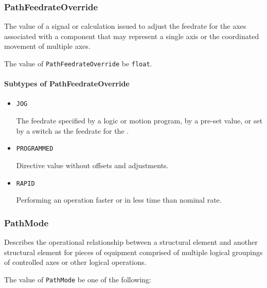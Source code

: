 \subsubsection{PathFeedrateOverride}
\label{sec:PathFeedrateOverride}



The value of a signal or calculation issued to adjust the feedrate for the axes associated with a  component that may represent a single axis or the coordinated movement of multiple axes.


The value of \texttt{PathFeedrateOverride} \MUST be \texttt{float}.


\paragraph{Subtypes of PathFeedrateOverride}\mbox{}
\label{sec:Subtypes of PathFeedrateOverride}

\begin{itemize}

\item \texttt{JOG}


The feedrate specified by a logic or motion program, by a pre-set value, or set by a switch as the feedrate for the . 

\item \texttt{PROGRAMMED}


Directive value without offsets and adjustments.

\item \texttt{RAPID}


Performing an operation faster or in less time than nominal rate.


\end{itemize}






\subsubsection{PathMode}
\label{sec:PathMode}



Describes the operational relationship between a  \gls{structural element} and another  \gls{structural element} for pieces of equipment comprised of multiple logical groupings of controlled axes or other logical operations.


The value of \texttt{PathMode} \MUST be one of the following: 


